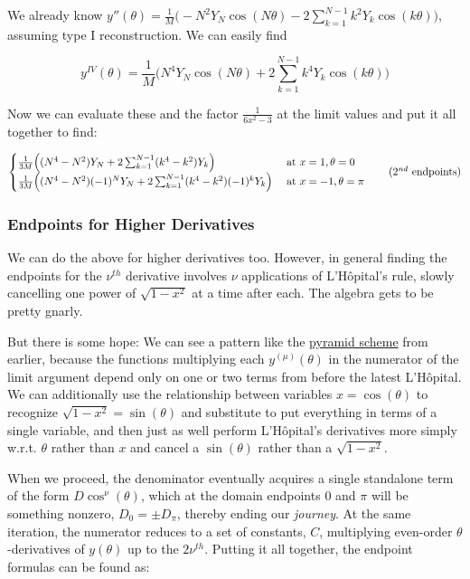 \documentclass[10pt]{article}
\begin{document}
We already know $y''(\theta) = \frac{1}{M} \Big(-N^2 Y_N \cos(N\theta) - 2 \sum_{k=1}^{N-1} k^2 Y_k \cos(k\theta) \Big)$, assuming type I reconstruction. We can easily find

$$y^{IV}(\theta) = \frac{1}{M} \Big(N^4 Y_N \cos(N\theta) + 2 \sum_{k=1}^{N-1} k^4 Y_k \cos(k\theta) \Big)$$

Now we can evaluate these and the factor $\frac{1}{6x^2 - 3}$ at the limit values and put it all together to find: 

\[
\begin{cases} \frac{1}{3M} \Big((N^4 - N^2) Y_N + 2 \sum_{k=1}^{N-1} (k^4 - k^2) Y_k \Big) & \text{ at } x=1, \theta=0 \\ \frac{1}{3M} \Big((N^4 - N^2)(-1)^N Y_N + 2 \sum_{k=1}^{N-1} (k^4 - k^2) (-1)^k Y_k \Big) & \text{ at } x=-1, \theta=\pi \end{cases} \tag{$2^{nd}$ endpoints}
\]

\subsubsection{Endpoints for Higher Derivatives}

We can do the above for higher derivatives too. However, in general finding the endpoints for the $\nu^{th}$ derivative involves $\nu$ applications of L'Hôpital's rule, slowly cancelling one power of $\sqrt{1-x^2}$ at a time after each. The algebra gets to be pretty gnarly.

But there is some hope: We can see a pattern like the \hyperref[pyramid]{pyramid scheme} from earlier, because the functions multiplying each $y^{(\mu)}(\theta)$ in the numerator of the limit argument depend only on one or two terms from before the latest L'Hôpital. We can additionally use the relationship between variables $x = \cos(\theta)$ to recognize $\sqrt{1-x^2} = \sin(\theta)$ and substitute to put everything in terms of a single variable, and then just as well perform L'Hôpital's derivatives more simply w.r.t. $\theta$ rather than $x$ and cancel a $\sin(\theta)$ rather than a $\sqrt{1-x^2}$.

When we proceed, the denominator eventually acquires a single standalone term of the form $D\cos^\nu(\theta)$, which at the domain endpoints $0$ and $\pi$ will be something nonzero, $D_0 = \pm D_\pi$, thereby ending our \textit{journey}. At the same iteration, the numerator reduces to a set of constants, $C$, multiplying even-order $\theta$-derivatives of $y(\theta)$ up to the $2\nu^{th}$. Putting it all together, the endpoint formulas can be found as:
\end{document}
